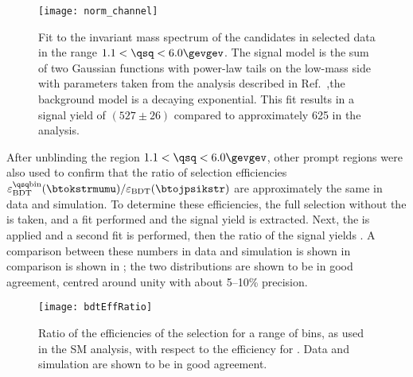 \begin{figure}
  \begin{center}
    \texttt{[image: norm\_channel]}
    \caption[Fit to the normalisation channel, \btokstrmumu for $1.1<\qsq<6.0\gevgev$]
    {
      Fit to the invariant mass spectrum of the \Bd candidates in selected data in the range
      $1.1<\qsq<6.0\gevgev$.
      The signal model is the sum of two Gaussian functions with power-law tails on the low-mass
      side with parameters taken from the analysis described in
      Ref.~\protect\cite{LHCb-CONF-2015-002},the background model is a decaying exponential.
      This fit results in a signal yield of $(527\pm26)$ compared to approximately 625 in the \sm
      analysis.
    }
    \label{fig:db:norm}
  \end{center}
\end{figure}

After unblinding the region $1.1<\qsq<6.0\gevgev$, other prompt \qsq regions were also used to
confirm that the ratio of \bdt selection efficiencies
$\varepsilon_\mathrm{BDT}^\mathrm{\qsq bin}(\btokstrmumu) / \varepsilon_\mathrm{BDT}(\btojpsikstr)$
are approximately the same in data and simulation.
To determine these efficiencies, the full selection without the \BDT is taken, and a fit performed
and the signal yield is extracted.
Next, the \BDT is applied and a second fit is performed, then  the ratio of the signal
yields .
A comparison between these numbers in data and simulation is shown in comparison is shown in
; the two distributions are shown to be in good agreement, centred around
unity with about 5--10\% precision.

\begin{figure}
  \begin{center}
    \texttt{[image: bdtEffRatio]}
    \caption[Efficiency ratios]
    {
      Ratio of the efficiencies of the \bdt selection for a range of \qsq bins, as used in the SM
      \btokstrmumu analysis, with respect to the efficiency for \decay{\Bd}{\jpsi\Kstarz}.
      Data and simulation are shown to be in good agreement.
    }
    \label{fig:bdtEffRatio}
  \end{center}
\end{figure}

